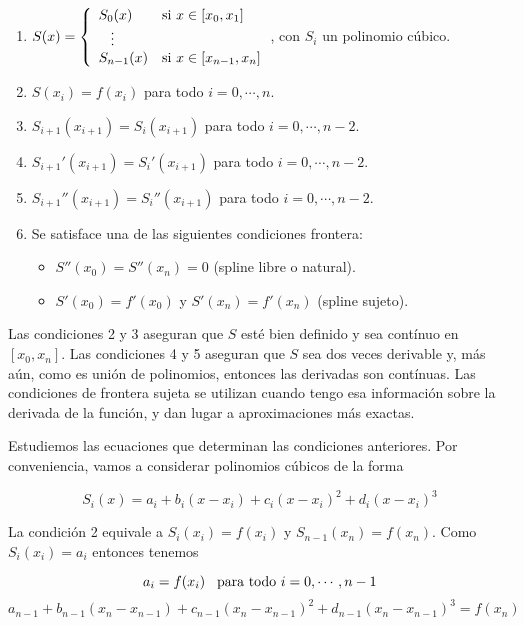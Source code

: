 \begin{enumerate}
\item $
S(x) = 
\left\{
	\begin{array}{ll}
		S_0(x)  & \mbox{si } x \in [x_{0}, x_1] \\
		\hspace{0.3cm}\vdots \\		
		S_{n - 1}(x) & \mbox{si } x \in [x_{n - 1}, x_n]
	\end{array}
\right.
$, con $S_i$ un polinomio cúbico.

\item $S(x_i) = f(x_i)$ para todo $i = 0, \cdots, n$.
\item $S_{i + 1}(x_{i + 1}) = S_i(x_{i + 1})$ para todo $i = 0, \cdots, n - 2$.
\item $S_{i + 1}'(x_{i + 1}) = S_i'(x_{i + 1})$ para todo $i = 0, \cdots, n - 2$.
\item $S_{i + 1}''(x_{i + 1}) = S_i''(x_{i + 1})$ para todo $i = 0, \cdots, n - 2$.
\item Se satisface una de las siguientes condiciones frontera:
\begin{itemize}
\item $S''(x_0) = S''(x_n) = 0$ (spline libre o natural).
\item $S'(x_0) = f'(x_0)$ y $S'(x_n) = f'(x_n)$ (spline sujeto).
\end{itemize} 
\end{enumerate}

Las condiciones 2 y 3 aseguran que $S$ esté bien definido y sea contínuo en $[x_0, x_n]$. Las condiciones 4 y 5 aseguran que $S$ sea dos veces derivable y, más aún, como es unión de polinomios, entonces las derivadas son contínuas. Las condiciones de frontera sujeta se utilizan cuando tengo esa información sobre la derivada de la función, y dan lugar a aproximaciones más exactas.

Estudiemos las ecuaciones que determinan las condiciones anteriores. Por conveniencia, vamos a considerar polinomios cúbicos de la forma

\[S_i(x) = a_i + b_i (x - x_i) + c_i (x - x_i)^2 + d_i (x - x_i)^3\]

La condición 2 equivale a $S_i(x_i) = f(x_i)$ y $S_{n - 1}(x_n) = f(x_n)$. Como $S_i(x_i) = a_i$ entonces tenemos

\[a_i = f(x_i) \hspace{0.3cm}\text{para todo } i = 0, \cdots, n - 1\]
\[a_{n - 1} + b_{n - 1} (x_n - x_{n - 1}) + c_{n - 1} (x_n - x_{n - 1})^2 + d_{n - 1} (x_n - x_{n - 1})^3 = f(x_n)\]

